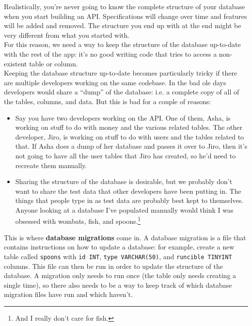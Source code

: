 Realistically, you're never going to know the complete structure of your database when you start building an API. Specifications will change over time and features will be added and removed. The structure you end up with at the end might be very different from what you started with.
\\

For this reason, we need a way to keep the structure of the database up-to-date with the rest of the app: it's no good writing code that tries to access a non-existent table or column.
\\

Keeping the database structure up-to-date becomes particularly tricky if there are multiple developers working on the same codebase. In the bad ole days developers would share a ``dump'' of the database: i.e. a complete copy of all of the tables, columns, and data. But this is bad for a couple of reasons:

\begin{itemize}
    \item Say you have two developers working on the API. One of them, Asha, is working on stuff to do with money and the various related tables. The other developer, Jiro, is working on stuff to do with users and the tables related to that. If Asha does a dump of her database and passes it over to Jiro, then it's not going to have all the user tables that Jiro has created, so he'd need to recreate them manually.

    \item Sharing the structure of the database is desirable, but we probably don't want to share the test data that other developers have been putting in. The things that people type in as test data are probably best kept to themselves. Anyone looking at a database I've populated manually would think I was obsessed with wombats, fish, and spoons.\footnote{And I really don't care for fish.}
\end{itemize}

This is where \textbf{database migrations} come in. A database migration is a file that contains instructions on how to update a database: for example, create a new table called \texttt{spoons} with \texttt{id INT}, \texttt{type VARCHAR(50)}, and \texttt{runcible TINYINT} columns. This file can then be run in order to update the structure of the database. A migration only needs to run once (the table only needs creating a single time), so there also needs to be a way to keep track of which database migration files have run and which haven't.


